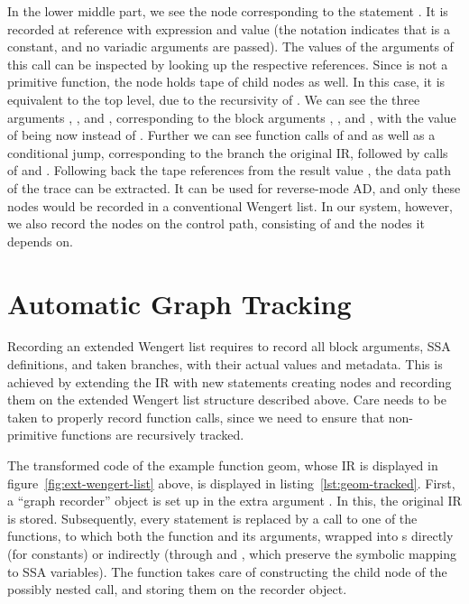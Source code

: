 In the lower middle part, we see the node corresponding to the statement .  It is recorded at reference  with expression  and value
 (the notation  indicates that  is a constant, and
no variadic arguments are passed). The values of the arguments of this call can be inspected by
looking up the respective references.  Since  is not a primitive function, the node
holds tape of child nodes as well.  In this case, it is equivalent to the top level, due to the
recursivity of . We can see the three arguments , , and ,
corresponding to the block arguments , , and , with the value of
 being now  instead of .  Further we can see function calls of
 and \jlinl{<} as well as a conditional jump, corresponding to the branch the original
IR, followed by calls of \jlinl{+} and . Following back the tape references from the
result value , the data path of the trace can be extracted.  It can be used for
reverse-mode AD, and only these nodes would be recorded in a conventional Wengert list.  In our
system, however, we also record the nodes on the control path, consisting of  and the
nodes it depends on.


\section{Automatic Graph Tracking}
\label{sec:autom-graph-track}

Recording an extended Wengert list requires to record all block arguments, SSA definitions, and
taken branches, with their actual values and metadata. This is achieved by extending the IR with new
statements creating nodes and recording them on the extended Wengert list structure described
above. Care needs to be taken to properly record function calls, since we need to ensure that
non-primitive functions are recursively tracked.   

The transformed code of the example function geom, whose IR is displayed in
figure~\ref{fig:ext-wengert-list} above, is displayed in listing~\ref{lst:geom-tracked}.  First, a
\enquote{graph recorder} object is set up in the extra argument .  In this, the original
IR is stored.  Subsequently, every statement is replaced by a call to one of the
\protect{} functions, to which both the function and its arguments, wrapped into
s directly (for constants) or indirectly (through  and
, which preserve the symbolic mapping to SSA variables).  The 
function takes care of constructing the child node of the possibly nested call, and storing them on
the recorder object.

